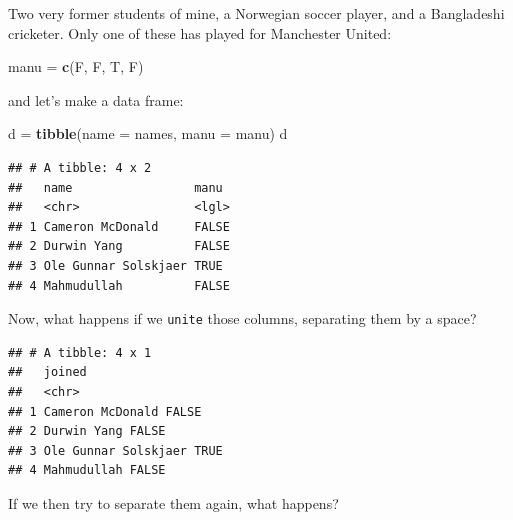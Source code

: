 \documentclass[]{tufte-book}
\newenvironment{Shaded}{}{}
\newcommand{\DataTypeTok}[1]{\textcolor[rgb]{0.56,0.13,0.00}{#1}}
\newcommand{\KeywordTok}[1]{\textcolor[rgb]{0.00,0.44,0.13}{\textbf{#1}}}
\newcommand{\NormalTok}[1]{#1}
\newcommand{\OperatorTok}[1]{\textcolor[rgb]{0.40,0.40,0.40}{#1}}
\newcommand{\StringTok}[1]{\textcolor[rgb]{0.25,0.44,0.63}{#1}}
\theoremstyle{definition}
\theoremstyle{definition}
\theoremstyle{definition}
\theoremstyle{remark}
\begin{document}
Two very former students of mine, a Norwegian soccer player, and a
Bangladeshi cricketer. Only one of these has played for Manchester
United:

\begin{Shaded}
\begin{Highlighting}[]
\NormalTok{manu =}\StringTok{ }\KeywordTok{c}\NormalTok{(F, F, T, F)}
\end{Highlighting}
\end{Shaded}

and let's make a data frame:

\begin{Shaded}
\begin{Highlighting}[]
\NormalTok{d =}\StringTok{ }\KeywordTok{tibble}\NormalTok{(}\DataTypeTok{name =}\NormalTok{ names, }\DataTypeTok{manu =}\NormalTok{ manu)}
\NormalTok{d}
\end{Highlighting}
\end{Shaded}

\begin{verbatim}
## # A tibble: 4 x 2
##   name                 manu 
##   <chr>                <lgl>
## 1 Cameron McDonald     FALSE
## 2 Durwin Yang          FALSE
## 3 Ole Gunnar Solskjaer TRUE 
## 4 Mahmudullah          FALSE
\end{verbatim}

Now, what happens if we \texttt{unite} those columns, separating them by
a space?

\begin{Shaded}
\end{Shaded}

\begin{verbatim}
## # A tibble: 4 x 1
##   joined                   
##   <chr>                    
## 1 Cameron McDonald FALSE   
## 2 Durwin Yang FALSE        
## 3 Ole Gunnar Solskjaer TRUE
## 4 Mahmudullah FALSE
\end{verbatim}

If we then try to separate them again, what happens?

\begin{Shaded}
\end{Shaded}
\end{document}
